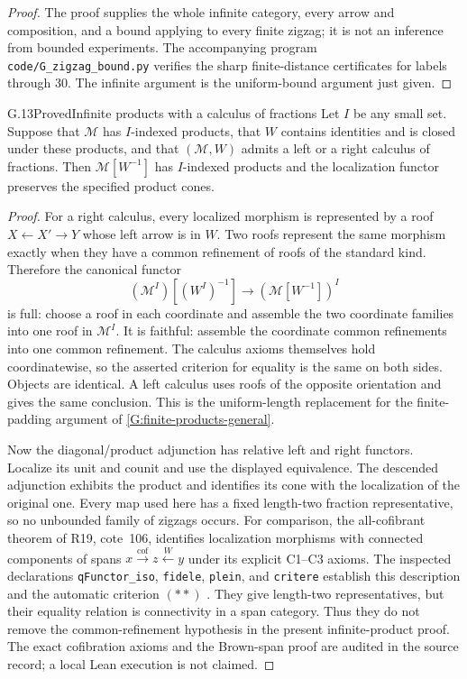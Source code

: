 \begin{proof}
The proof supplies the whole infinite category, every arrow and
composition, and a bound applying to every finite zigzag; it is
not an inference from bounded experiments.  The accompanying
program \texttt{code/G\_zigzag\_bound.py} verifies the sharp
finite-distance certificates for labels through $30$.  The
infinite argument is the uniform-bound argument just given.
\end{proof}

\begin{claim}{G.13}{Proved}{Infinite products with a calculus of fractions}
\label{G:fractions-products}
Let $I$ be any small set.  Suppose that $\mathcal M$ has
$I$-indexed products, that $W$ contains identities and is closed
under these products, and that $(\mathcal M,W)$ admits a left
or a right calculus of fractions.  Then $\mathcal M[W^{-1}]$
has $I$-indexed products and the localization functor preserves
the specified product cones.
\end{claim}
\begin{proof}
For a right calculus, every localized morphism is represented
by a roof $X\leftarrow X'\to Y$ whose left arrow is in $W$.
Two roofs represent the same morphism exactly when they have
a common refinement of roofs of the standard kind.  Therefore
the canonical functor
\[
 (\mathcal M^I)[(W^I)^{-1}]
       \longrightarrow (\mathcal M[W^{-1}])^I
\]
is full: choose a roof in each coordinate and assemble the
two coordinate families into one roof in $\mathcal M^I$.
It is faithful: assemble the coordinate common refinements into
one common refinement.  The calculus axioms themselves hold
coordinatewise, so the asserted criterion for equality is the
same on both sides.  Objects are identical.  A left calculus
uses roofs of the opposite orientation and gives the same
conclusion.  This is the uniform-length replacement for the
finite-padding argument of \ref{G:finite-products-general}.

Now the diagonal/product adjunction has relative left and right
functors.  Localize its unit and counit and use the displayed
equivalence.  The descended adjunction exhibits the product
and identifies its cone with the localization of the original
one.  Every map used here has a fixed length-two fraction
representative, so no unbounded family of zigzags occurs.
For comparison, the all-cofibrant theorem of R19, cote~106,
identifies localization morphisms with connected components of
spans $x\xrightarrow{\mathrm{cof}}z\xleftarrow{W}y$ under its
explicit C1--C3 axioms. The inspected declarations
\texttt{qFunctor\_iso}, \texttt{fidele}, \texttt{plein}, and
\texttt{critere} establish this description and the automatic
criterion $(**)$ \cite{FR19Hua106}. They give length-two
representatives, but their equality relation is connectivity in a
span category. Thus they do not remove the common-refinement
hypothesis in the present infinite-product proof. The exact
cofibration axioms and the Brown-span proof are audited in the
source record; a local Lean execution is not claimed.
\end{proof}

